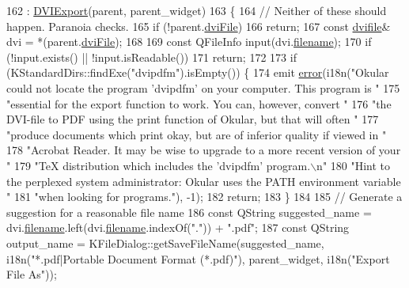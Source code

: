 \begin{DoxyCode}
162   : \hyperlink{classDVIExport_a126208c08ed676e76ca5442da3c6ae79}{DVIExport}(parent, parent\_widget)
163 \{
164   \textcolor{comment}{// Neither of these should happen. Paranoia checks.}
165   \textcolor{keywordflow}{if} (!parent.\hyperlink{classdviRenderer_a67ded13a1a8da343aa0ee921ed96d4c2}{dviFile})
166     \textcolor{keywordflow}{return};
167   \textcolor{keyword}{const} \hyperlink{classdvifile}{dvifile}& dvi = *(parent.\hyperlink{classdviRenderer_a67ded13a1a8da343aa0ee921ed96d4c2}{dviFile});
168 
169   \textcolor{keyword}{const} QFileInfo input(dvi.\hyperlink{classdvifile_a1c0fe420231e71f256b5db367b7e1178}{filename});
170   \textcolor{keywordflow}{if} (!input.exists() || !input.isReadable())
171     \textcolor{keywordflow}{return};
172 
173   \textcolor{keywordflow}{if} (KStandardDirs::findExe(\textcolor{stringliteral}{"dvipdfm"}).isEmpty()) \{
174     emit \hyperlink{classDVIExport_af4dc2cb358975a05b15c145fbe8d4e8f}{error}(i18n(\textcolor{stringliteral}{"Okular could not locate the program 'dvipdfm' on your computer. This program is "}
175                     \textcolor{stringliteral}{"essential for the export function to work. You can, however, convert "}
176                     \textcolor{stringliteral}{"the DVI-file to PDF using the print function of Okular, but that will often "}
177                     \textcolor{stringliteral}{"produce documents which print okay, but are of inferior quality if viewed in "}
178                     \textcolor{stringliteral}{"Acrobat Reader. It may be wise to upgrade to a more recent version of your "}
179                     \textcolor{stringliteral}{"TeX distribution which includes the 'dvipdfm' program.\(\backslash\)n"}
180                     \textcolor{stringliteral}{"Hint to the perplexed system administrator: Okular uses the PATH environment variable 
      "}
181                     \textcolor{stringliteral}{"when looking for programs."}), -1);
182     \textcolor{keywordflow}{return};
183   \}
184 
185   \textcolor{comment}{// Generate a suggestion for a reasonable file name}
186   \textcolor{keyword}{const} QString suggested\_name = dvi.\hyperlink{classdvifile_a1c0fe420231e71f256b5db367b7e1178}{filename}.left(dvi.\hyperlink{classdvifile_a1c0fe420231e71f256b5db367b7e1178}{filename}.indexOf(\textcolor{stringliteral}{"."})) + \textcolor{stringliteral}{".pdf"};
187   \textcolor{keyword}{const} QString output\_name = KFileDialog::getSaveFileName(suggested\_name, i18n(\textcolor{stringliteral}{"*.pdf|Portable Document
       Format (*.pdf)"}), parent\_widget, i18n(\textcolor{stringliteral}{"Export File As"}));

\end{DoxyCode}
